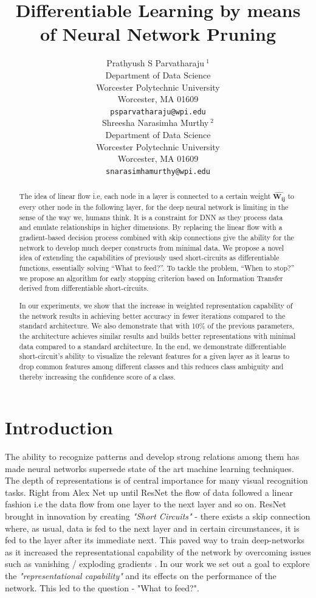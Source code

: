 \documentclass{article}
\title{Differentiable Learning by means of Neural Network Pruning}
\author{
  Prathyush S Parvatharaju$\ ^{1}$\\
  Department of Data Science\\
  Worcester Polytechnic University\\
  Worcester, MA 01609 \\
  \texttt{psparvatharaju@wpi.edu} \\
   \And
 Shreesha Narasimha Murthy$\ ^{2}$ \\
  Department of Data Science\\
  Worcester Polytechnic University\\
  Worcester, MA 01609 \\
  \texttt{snarasimhamurthy@wpi.edu} \\
}
\let\oldhat\hat
\renewcommand{\hat}[1]{\oldhat{\mathbf{#1}}}
\begin{document}
\maketitle



\begin{abstract}
The idea of linear flow i.e, each node in a layer is connected to a certain weight $\hat{W_{ij}}$ to every other node in the following layer, for the deep neural network is limiting in the sense of the way we, humans think. It is a constraint for DNN as they process data and emulate relationships in higher dimensions. By replacing the linear flow with a gradient-based decision process combined with skip connections give the ability for the network to develop much deeper constructs from minimal data. We propose a novel idea of extending the capabilities of previously used short-circuits as differentiable functions, essentially solving “What to feed?”. To tackle the problem, “When to stop?” we propose an algorithm for early stopping criterion based on Information Transfer derived from differentiable short-circuits. 

In our experiments, we show that the increase in weighted representation capability of the network results in achieving better accuracy in fewer iterations compared to the standard architecture. We also demonstrate that with 10\% of the previous parameters, the architecture achieves similar results and builds better representations with minimal data compared to a standard architecture. In the end, we demonstrate differentiable short-circuit's ability to visualize the relevant features for a given layer as it learns to drop common features among different classes and this reduces class ambiguity and thereby increasing the confidence score of a class.
\end{abstract}




\section{Introduction}
The ability to recognize patterns and develop strong relations among them has made neural networks supersede state of the art machine learning techniques. The depth of representations is of central importance for many visual recognition tasks. Right from Alex Net \cite{Krizhevsky2012ImageNetCW} up until ResNet \cite{He2016DeepRL} the flow of data followed a linear fashion i.e the data flow from one layer to the next layer and so on. ResNet brought in innovation by creating \emph{"Short Circuits"} - there exists a skip connection where, as usual, data is fed to the next layer and in certain circumstances, it is fed to the layer after its immediate next. This paved way to train deep-networks as it increased the representational capability of the network by overcoming issues such as vanishing / exploding gradients \cite{Bengio1994LearningLD, Glorot2010UnderstandingTD}. In our work we set out a goal to explore the \emph{"representational capability"} and its effects on the performance of the network. This led to the question - "What to feed?".
\end{document}
